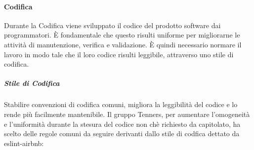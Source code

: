 \paragraph{Codifica}
Durante la Codifica viene sviluppato il codice del prodotto software dai programmatori. È fondamentale che questo risulti uniforme per migliorarne le attività di manutenzione, verifica e validazione. È quindi necessario normare il lavoro in modo tale che il loro codice risulti leggibile, attraverso uno stile di codifica.
\subparagraph*{Stile di Codifica}
Stabilire convenzioni di codifica comuni, migliora la leggibilità del codice e lo rende più facilmente mantenibile. Il gruppo Tenners, per aumentare l'omogeneità e l'uniformità durante la stesura del codice non chè richiesto da capitolato, ha scelto delle regole comuni da seguire derivanti dallo stile di codfica dettato da eslint-airbnb:
